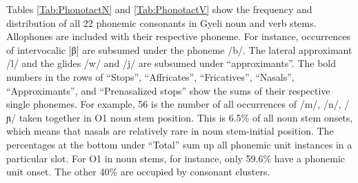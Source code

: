 Tables \ref{Tab:PhonotactN} and \ref{Tab:PhonotactV} show the frequency and distribution of all 22 phonemic consonants in Gyeli noun and verb stems. Allophones are included with their respective phoneme. For instance, occurrences of intervocalic [β] are subsumed under the phoneme /b/.  The lateral approximant /l/ and the glides /w/ and /j/ are subsumed under ``approximants''.  The bold numbers in the rows of ``Stops'', ``Affricates'',  ``Fricatives'', ``Nasals'', ``Approximants'', and ``Prenasalized stops'' show the sums of their respective single phonemes. For example, 56 is the number of all occurrences of /m/, /n/, /ɲ/ taken together in O1 noun stem position. This is 6.5\% of all noun stem onsets, which means that nasals are relatively rare in noun stem-initial position.
The percentages at the bottom under ``Total'' sum up all phonemic unit instances in a particular slot. For O1 in noun stems, for instance, only 59.6\% have a phonemic unit onset. The other 40\% are occupied by consonant clusters.


